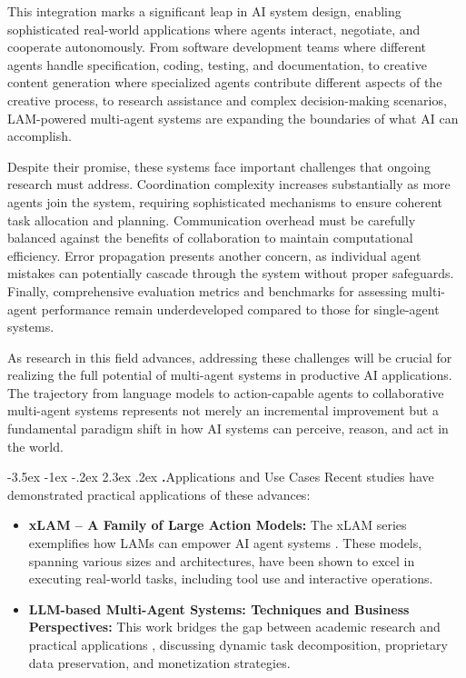 \documentclass[journal,twoside,10pt]{IEEEtran}
\makeatletter
\renewcommand\section{\@startsection{section}{1}{\z@}%
                       {-3.5ex \@plus -1ex \@minus -.2ex}%
                       {2.3ex \@plus.2ex}%
                       {\normalfont\Large\bfseries\Roman{section}.\quad}}
\makeatother
\begin{document}
This integration marks a significant leap in AI system design, enabling sophisticated real-world applications where agents interact, negotiate, and cooperate autonomously. From software development teams where different agents handle specification, coding, testing, and documentation, to creative content generation where specialized agents contribute different aspects of the creative process, to research assistance and complex decision-making scenarios, LAM-powered multi-agent systems are expanding the boundaries of what AI can accomplish.

Despite their promise, these systems face important challenges that ongoing research must address. Coordination complexity increases substantially as more agents join the system, requiring sophisticated mechanisms to ensure coherent task allocation and planning. Communication overhead must be carefully balanced against the benefits of collaboration to maintain computational efficiency. Error propagation presents another concern, as individual agent mistakes can potentially cascade through the system without proper safeguards. Finally, comprehensive evaluation metrics and benchmarks for assessing multi-agent performance remain underdeveloped compared to those for single-agent systems.

As research in this field advances, addressing these challenges will be crucial for realizing the full potential of multi-agent systems in productive AI applications. The trajectory from language models to action-capable agents to collaborative multi-agent systems represents not merely an incremental improvement but a fundamental paradigm shift in how AI systems can perceive, reason, and act in the world.

\section{Applications and Use Cases}
Recent studies have demonstrated practical applications of these advances:

\begin{itemize}
    \item \textbf{xLAM – A Family of Large Action Models:} The xLAM series exemplifies how LAMs can empower AI agent systems \cite{xlam2024}. These models, spanning various sizes and architectures, have been shown to excel in executing real-world tasks, including tool use and interactive operations.
    \item \textbf{LLM-based Multi-Agent Systems: Techniques and Business Perspectives:} This work bridges the gap between academic research and practical applications \cite{mas_business2023}, discussing dynamic task decomposition, proprietary data preservation, and monetization strategies.
\end{itemize}
\end{document}
